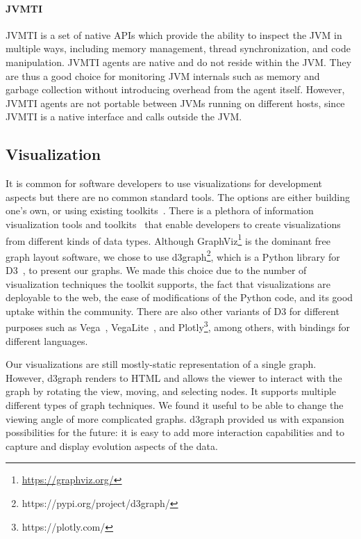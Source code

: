 \paragraph{JVMTI}
JVMTI is a set of native APIs which provide the ability to inspect the JVM in multiple ways, including memory management, 
thread synchronization, and code manipulation.
JVMTI agents are native and do not reside within the JVM. 
They are thus a good choice for monitoring JVM internals such as memory and garbage collection without introducing overhead from the agent itself.
However, JVMTI agents are not portable between JVMs running on different hosts, since JVMTI is a native interface and calls outside the JVM.

\subsection{Visualization}

It is common for software developers to use visualizations for development aspects but there are no common standard tools. The options are either building one's own, or using existing toolkits~\cite{paredes2014}. There is a plethora of information visualization tools and toolkits~\cite{heer2010,liu2014} that enable developers to create visualizations from different kinds of data types. 
Although GraphViz\footnote{\url{https://graphviz.org/}} is the dominant
free graph layout software, we chose to use d3graph\footnote{https://pypi.org/project/d3graph/}, which is a Python library for D3~\cite{bostock2011}, to present our graphs. We made this choice due to the number of visualization techniques the toolkit supports, the fact that visualizations are deployable to the web, the ease of modifications of the Python code, and its good uptake within the community. There are also other variants of D3 for different purposes such as Vega~\cite{satyanarayan2016}, VegaLite~\cite{satyanarayan2017}, and Plotly\footnote{https://plotly.com/}, among others, with bindings for different languages.

Our visualizations are still mostly-static representation of a single graph. However,
d3graph renders to HTML and allows the viewer to interact with the graph by rotating the view, moving, and selecting nodes. It supports multiple different types of graph techniques. We found it useful to be able to change the viewing angle of more complicated graphs. d3graph provided us with expansion possibilities for the future: it is easy to add more interaction capabilities and to capture and display evolution aspects of the data.

